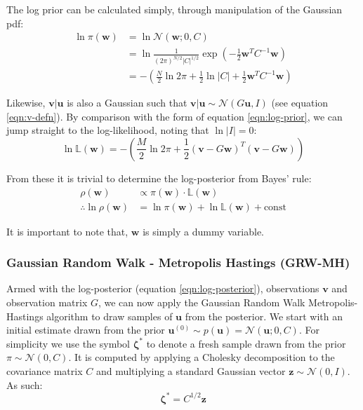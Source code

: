 \documentclass[]{article}
\newcommand{\Ncal}{\mathcal{N}}
\newcommand{\lik}{\mathbb{L}}
\newcommand{\ubold}{\boldsymbol{u}}
\newcommand{\vbold}{\boldsymbol{v}}
\newcommand{\wbold}{\boldsymbol{w}}
\newcommand{\zbold}{\boldsymbol{z}}
\newcommand{\zetabold}{\boldsymbol{\zeta^*}}
\begin{document}
The log prior can be calculated simply, through manipulation of the Gaussian pdf:
%
\begin{align}
	\ln \pi (\wbold) &= \ln \Ncal(\wbold; 0, C) \nonumber \\
	&= \ln \frac{1}{(2\pi)^{N/2} |C|^{1/2}} \exp \left( - \frac{1}{2} \wbold^T C^{-1} \wbold \right) \nonumber \\
	&= - \left( \frac{N}{2} \ln 2\pi + \frac{1}{2} \ln |C| + \frac{1}{2} \wbold^T C^{-1} \wbold \right)
	\label{eqn:log-prior}
\end{align}

Likewise, $\vbold | \ubold$ is also a Gaussian such that $\vbold |\ubold \sim \Ncal(G\ubold, I)$ (see equation \ref{eqn:v-defn}). By comparison with the form of equation \ref{eqn:log-prior}, we can jump straight to the log-likelihood, noting that $\ln |I| = 0$:
%
\begin{equation}
	\ln \lik(\wbold) = - \left( \frac{M}{2} \ln 2 \pi + \frac{1}{2} \left(\vbold - G\wbold \right)^T \left(\vbold - G\wbold\right)\right)
	\label{eqn:log-likelihood}
\end{equation}

From these it is trivial to determine the log-posterior from Bayes' rule:
%
\begin{align}
	\rho(\wbold) &\propto \pi(\wbold) \cdot \lik(\wbold) \nonumber \\
	\therefore \ln \rho(\wbold) &= \ln \pi(\wbold) + \ln \lik(\wbold) + \textrm{const}
	\label{eqn:log-posterior}
\end{align}

It is important to note that, $\wbold$ is simply a dummy variable.

\subsubsection{Gaussian Random Walk - Metropolis Hastings (GRW-MH)}

Armed with the log-posterior (equation \ref{eqn:log-posterior}), observations $\vbold$ and observation matrix $G$, we can now apply the Gaussian Random Walk Metropolis-Hastings algorithm to draw samples of $\ubold$ from the posterior. We start with an initial estimate drawn from the prior $\ubold^{(0)} \sim p(\ubold) = \Ncal(\ubold; 0, C)$. For simplicity we use the symbol $\zetabold$ to denote a fresh sample drawn from the prior $\pi \sim \Ncal(0, C)$. It is computed by applying a Cholesky decomposition to the covariance matrix $C$ and multiplying a standard Gaussian vector $\zbold \sim \Ncal(0, I)$. As such:
%
\begin{equation}
	\zetabold = C^{1/2} \zbold
	\label{eqn:zeta}
\end{equation}
\end{document}
